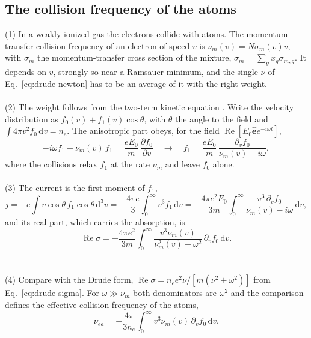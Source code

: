 \documentclass[11pt]{article}
\numberwithin{equation}{section}
\newcommand{\ehat}{\hat{\mathbf e}}
\newcommand{\nuea}{\nu_{ea}}
\newcommand{\num}{\nu_m}
\newcommand{\dd}{\mathrm d}
\DeclareMathOperator{\Real}{Re}
\begin{document}
\subsection{The collision frequency of the atoms}
\label{sec:atoms}
{\noindent}(1) In a weakly ionized gas the electrons collide with atoms. The
momentum-transfer collision frequency of an electron of speed $v$ is
$\num(v)=N\sigma_m(v)v$, with $\sigma_m$ the momentum-transfer cross section of the
mixture, $\sigma_m=\sum_gx_g\sigma_{m,g}$. It depends on $v$, strongly so near a
Ramsauer minimum, and the single $\nu$ of Eq.~\eqref{eq:drude-newton} has to be an
average of it with the right weight.
\\ \\
{\noindent}(2) The weight follows from the two-term kinetic equation
\cite{HP2005}. Write the velocity distribution as $f_0(v)+f_1(v)\cos\theta$, with
$\theta$ the angle to the field and $\int4\pi v^2f_0\,\dd v=n_e$. The anisotropic part
obeys, for the field $\Real[E_0\ehat e^{-i\omega t}]$,
\begin{equation}
-i\omega f_1+\num(v)\,f_1=\frac{eE_0}{m}\,\frac{\partial f_0}{\partial v}
\quad\longrightarrow\quad
f_1=\frac{eE_0}{m}\,\frac{\partial_vf_0}{\num(v)-i\omega},
\label{eq:f1}
\end{equation}
where the collisions relax $f_1$ at the rate $\num$ and leave $f_0$ alone.
\\ \\
{\noindent}(3) The current is the first moment of $f_1$,
\begin{equation}
j=-e\int v\cos\theta\,f_1\cos\theta\,\dd^3v=-\frac{4\pi e}{3}\int_0^\infty v^3f_1\,\dd v
=-\frac{4\pi e^2E_0}{3m}\int_0^\infty\frac{v^3\,\partial_vf_0}{\num(v)-i\omega}\,\dd v,
\label{eq:j-lorentz}
\end{equation}
and its real part, which carries the absorption, is
\begin{equation}
\Real\sigma=-\frac{4\pi e^2}{3m}\int_0^\infty\frac{v^3\num(v)}{\num^2(v)+\omega^2}\,\partial_vf_0\,\dd v.
\label{eq:resigma}
\end{equation}
\\ \\
{\noindent}(4) Compare with the Drude form, $\Real\sigma=n_ee^2\nu/[m(\nu^2+\omega^2)]$ from
Eq.~\eqref{eq:drude-sigma}. For $\omega\gg\num$ both denominators are $\omega^2$ and the
comparison defines the effective collision frequency of the atoms,
\begin{equation}
\nuea=-\frac{4\pi}{3n_e}\int_0^\infty v^3\num(v)\,\partial_vf_0\,\dd v.
\label{eq:nuea-general}
\end{equation}
\end{document}
